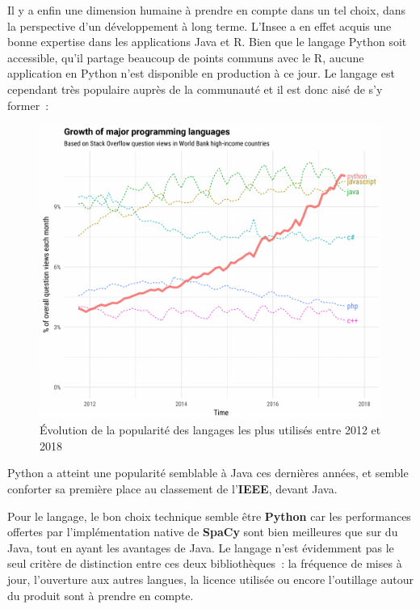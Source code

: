 Il y a enfin une dimension humaine à prendre en compte dans un tel choix, dans la perspective d'un développement à long terme. L'Insee a en effet acquis une bonne expertise dans les applications Java et R. Bien que le langage Python soit accessible, qu'il partage beaucoup de points communs avec le R, aucune application en Python n'est disponible en production à ce jour. Le langage est cependant très populaire auprès de la communauté et il est donc aisé de s'y former~:
\vspace{10pt}
\begin{figure}[H]
    \centering
    \includegraphics[scale=0.36]{images/languages-var.png}
    \caption{Évolution de la popularité des langages les plus utilisés entre 2012 et 2018}
    \label{fig:lang-var}
\end{figure}
\vspace{5pt}
Python a atteint une popularité semblable à Java ces dernières années, et semble conforter sa première place au classement de l'\textbf{IEEE}, devant Java.

Pour le langage, le bon choix technique semble être \textbf{Python} car les performances offertes par l'implémentation native de \textbf{SpaCy} sont bien meilleures que sur du Java, tout en ayant les avantages de Java. Le langage n'est évidemment pas le seul critère de distinction entre ces deux bibliothèques~: la fréquence de mises à jour, l'ouverture aux autres langues, la licence utilisée ou encore l'outillage autour du produit sont à prendre en compte.
\label{section 3.1.1}

